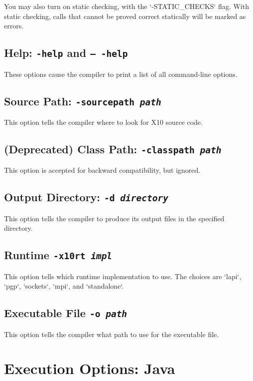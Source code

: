 You may also turn on static checking, with the \xcd`-STATIC_CHECKS` flag.  With
static checking, calls that cannot be proved correct statically will be
marked as errors.  





\subsection{Help: {\tt -help} and {\tt -- -help}}

These options cause the compiler to print a list of all command-line options.


\subsection{Source Path: {\tt -sourcepath {\em path}}}

This option tells the compiler where to look for X10 source code.  


\subsection{(Deprecated) Class Path: {\tt -classpath {\em path}}}

This option is accepted for backward compatibility, but ignored.

\subsection{Output Directory: {\tt -d {\em directory}}}

This option tells the compiler to produce its output files in the specified directory.

\subsection{Runtime {\tt -x10rt {\em impl}}}

This option tells which runtime implementation to use.  The choices are
\xcd`lapi`, \xcd`pgp`, \xcd`sockets`, \xcd`mpi`, and \xcd`standalone`.

\subsection{Executable File {\tt -o {\em path}}}

This option tells the compiler what path to use for the executable file. 

\section{Execution Options: Java}

